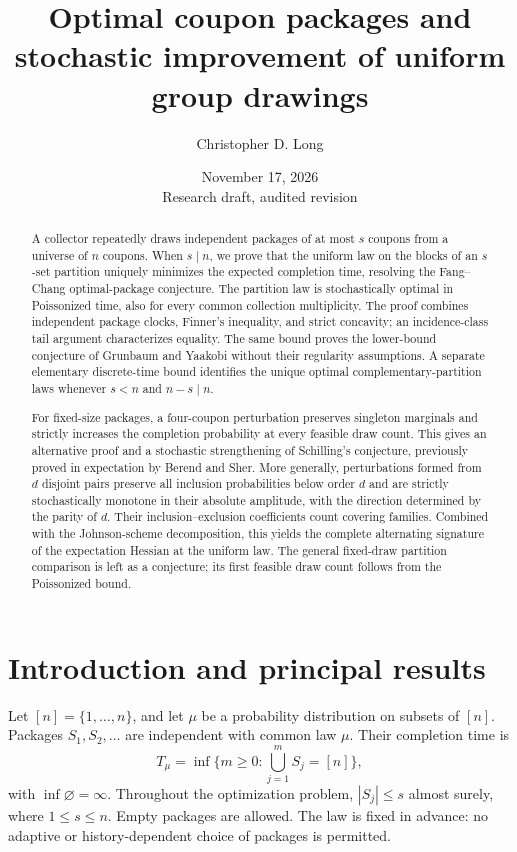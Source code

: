 \documentclass[11pt]{article}
\title{Optimal coupon packages and stochastic improvement of uniform group drawings}
\author{Christopher D. Long}
\date{November 17, 2026\\[3pt]\small Research draft, audited revision}
\numberwithin{equation}{section}
\theoremstyle{remark}
\newcommand{\1}{\mathbf 1}
\begin{document}
\maketitle

\begin{abstract}
A collector repeatedly draws independent packages of at most $s$ coupons from a universe of $n$ coupons. When $s\mid n$, we prove that the uniform law on the blocks of an $s$-set partition uniquely minimizes the expected completion time, resolving the Fang--Chang optimal-package conjecture. The partition law is stochastically optimal in Poissonized time, also for every common collection multiplicity. The proof combines independent package clocks, Finner's inequality, and strict concavity; an incidence-class tail argument characterizes equality. The same bound proves the lower-bound conjecture of Grunbaum and Yaakobi without their regularity assumptions. A separate elementary discrete-time bound identifies the unique optimal complementary-partition laws whenever $s<n$ and $n-s\mid n$.

For fixed-size packages, a four-coupon perturbation preserves singleton marginals and strictly increases the completion probability at every feasible draw count. This gives an alternative proof and a stochastic strengthening of Schilling's conjecture, previously proved in expectation by Berend and Sher. More generally, perturbations formed from $d$ disjoint pairs preserve all inclusion probabilities below order $d$ and are strictly stochastically monotone in their absolute amplitude, with the direction determined by the parity of $d$. Their inclusion--exclusion coefficients count covering families. Combined with the Johnson-scheme decomposition, this yields the complete alternating signature of the expectation Hessian at the uniform law. The general fixed-draw partition comparison is left as a conjecture; its first feasible draw count follows from the Poissonized bound.
\end{abstract}

\section{Introduction and principal results}

Let $[n]=\{1,\ldots,n\}$, and let $\mu$ be a probability distribution on subsets of $[n]$. Packages $S_1,S_2,\ldots$ are independent with common law $\mu$. Their completion time is
\[
 T_\mu=\inf\biggl\{m\geq 0:\bigcup_{j=1}^m S_j=[n]\biggr\},
\]
with $\inf\varnothing=\infty$. Throughout the optimization problem, $|S_j|\leq s$ almost surely, where $1\leq s\leq n$. Empty packages are allowed. The law is fixed in advance: no adaptive or history-dependent choice of packages is permitted.
\end{document}
